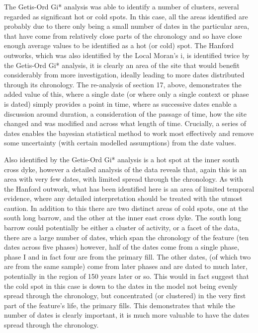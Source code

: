 The Getis-Ord Gi* analysis was able to identify a number of clusters, several regarded as significant hot or cold spots. In this case, all the areas identified are probably due to there only being a small number of dates in the particular area, that have come from relatively close parts of the chronology and so have close enough average values to be identified as a hot (or cold) spot.
The Hanford outworks, which was also identified by the Local Moran's i, is identified twice by the Getis-Ord Gi* analysis, it is clearly an area of the site that would benefit considerably from more investigation, ideally leading to more dates distributed through its chronology. The re-analysis of section 17, above, demonstrates the added value of this, where a single date (or where only a single context or phase is dated) simply provides a point in time, where as successive dates enable a discussion around duration, a consideration of the passage of time, how the site changed and was modified and across what length of time. Crucially, a series of dates enables the bayesian statistical method to work most effectively and remove some uncertainty (with certain modelled assumptions) from the date values.

Also identified by the Getis-Ord Gi* analysis is a hot spot at the inner south cross dyke, however a detailed analysis of the data reveals that, again this is an area with very few dates, with limited spread through the chronology. As with the Hanford outwork, what has been identified here is an area of limited temporal evidence, where any detailed interpretation should be treated with the utmost caution. In addition to this there are two distinct areas of cold spots, one at the south long barrow, and the other at the inner east cross dyke. The south long barrow could potentially be either a cluster of activity, or a facet of the data, there are a large number of dates, which span the chronology of the feature (ten dates across five phases) however, half of the dates come from a single phase, phase I and in fact four are from the primary fill. The other dates, (of which two are from the same sample) come from later phases and are dated to much later, potentially in the region of 150 years later or so. This would in fact suggest that the cold spot in this case is down to the dates in the model not being evenly spread through the chronology, but concentrated (or clustered) in the very first part of the feature's life, the primary fills. This demonstrates that while the number of dates is clearly important, it is much more valuable to have the dates spread through the chronology.

